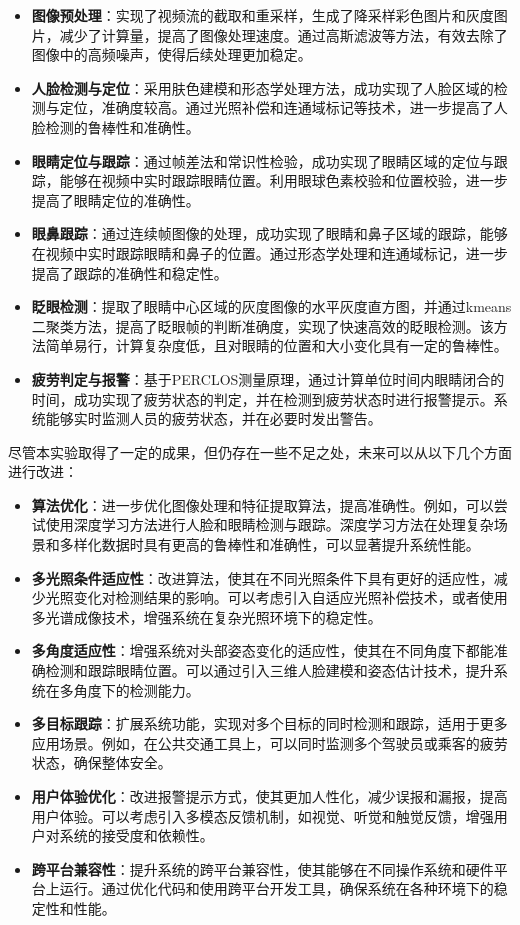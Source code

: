 \documentclass[12pt,hyperref,a4paper,UTF8]{ctexart}
\begin{document}
\begin{itemize}
    \item \textbf{图像预处理}：实现了视频流的截取和重采样，生成了降采样彩色图片和灰度图片，减少了计算量，提高了图像处理速度。通过高斯滤波等方法，有效去除了图像中的高频噪声，使得后续处理更加稳定。
    \item \textbf{人脸检测与定位}：采用肤色建模和形态学处理方法，成功实现了人脸区域的检测与定位，准确度较高。通过光照补偿和连通域标记等技术，进一步提高了人脸检测的鲁棒性和准确性。
    \item \textbf{眼睛定位与跟踪}：通过帧差法和常识性检验，成功实现了眼睛区域的定位与跟踪，能够在视频中实时跟踪眼睛位置。利用眼球色素校验和位置校验，进一步提高了眼睛定位的准确性。
    \item \textbf{眼鼻跟踪}：通过连续帧图像的处理，成功实现了眼睛和鼻子区域的跟踪，能够在视频中实时跟踪眼睛和鼻子的位置。通过形态学处理和连通域标记，进一步提高了跟踪的准确性和稳定性。
    \item \textbf{眨眼检测}：提取了眼睛中心区域的灰度图像的水平灰度直方图，并通过kmeans二聚类方法，提高了眨眼帧的判断准确度，实现了快速高效的眨眼检测。该方法简单易行，计算复杂度低，且对眼睛的位置和大小变化具有一定的鲁棒性。
    \item \textbf{疲劳判定与报警}：基于PERCLOS测量原理，通过计算单位时间内眼睛闭合的时间，成功实现了疲劳状态的判定，并在检测到疲劳状态时进行报警提示。系统能够实时监测人员的疲劳状态，并在必要时发出警告。
\end{itemize}


尽管本实验取得了一定的成果，但仍存在一些不足之处，未来可以从以下几个方面进行改进：

\begin{itemize}
    \item \textbf{算法优化}：进一步优化图像处理和特征提取算法，提高准确性。例如，可以尝试使用深度学习方法进行人脸和眼睛检测与跟踪。深度学习方法在处理复杂场景和多样化数据时具有更高的鲁棒性和准确性，可以显著提升系统性能。
    \item \textbf{多光照条件适应性}：改进算法，使其在不同光照条件下具有更好的适应性，减少光照变化对检测结果的影响。可以考虑引入自适应光照补偿技术，或者使用多光谱成像技术，增强系统在复杂光照环境下的稳定性。
    \item \textbf{多角度适应性}：增强系统对头部姿态变化的适应性，使其在不同角度下都能准确检测和跟踪眼睛位置。可以通过引入三维人脸建模和姿态估计技术，提升系统在多角度下的检测能力。
    \item \textbf{多目标跟踪}：扩展系统功能，实现对多个目标的同时检测和跟踪，适用于更多应用场景。例如，在公共交通工具上，可以同时监测多个驾驶员或乘客的疲劳状态，确保整体安全。
    \item \textbf{用户体验优化}：改进报警提示方式，使其更加人性化，减少误报和漏报，提高用户体验。可以考虑引入多模态反馈机制，如视觉、听觉和触觉反馈，增强用户对系统的接受度和依赖性。
    \item \textbf{跨平台兼容性}：提升系统的跨平台兼容性，使其能够在不同操作系统和硬件平台上运行。通过优化代码和使用跨平台开发工具，确保系统在各种环境下的稳定性和性能。
\end{itemize}





\end{document}
